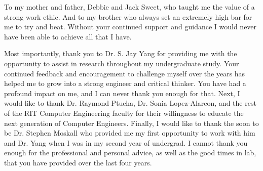 \documentclass[12pt,american]{report}
\begin{document}
\beforepreface%

\vfill
\begin{center}
To my mother and father, Debbie and Jack Sweet, who taught me the value of a strong work ethic. And to my brother who always set an extremely high bar for me to try and beat.  Without your continued support and guidance I would never have been able to achieve all that I have. 
\end{center}
\vfill

%
\vfill
\begin{center}
\indent Most importantly, thank you to Dr. S. Jay Yang for providing me with the opportunity to assist in research throughout my undergraduate study. Your continued feedback and encouragement to challenge myself over the years has helped me to grow into a strong engineer and critical thinker. You have had a profound impact on me, and I can never thank you enough for that. Next, I would like to thank Dr. Raymond Ptucha, Dr. Sonia Lopez-Alarcon, and the rest of the RIT Computer Engineering faculty for their willingness to educate the next generation of Computer Engineers. Finally, I would like to thank the soon to be Dr. Stephen Moskall who provided me my first opportunity to work with him and Dr. Yang when I was in my second year of undergrad. I cannot thank you enough for the professional and personal advice, as well as the good times in lab, that you have provided over the last four years.  
\end{center}
\vfill

\newcommand{\etc} {\emph{etc.\/}}
\newcommand{\etal}{\emph{et~al.\/}}
\newcommand{\eg}  {\emph{e.g.\/}}
\newcommand{\ie}  {\emph{i.e.\/}}
\end{document}
